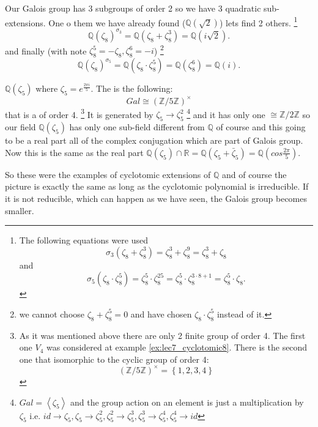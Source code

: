 \begin{example}[$n=8$]
  Our Galois group has 3 subgroups of order 2 so we have 3 quadratic
  sub-extensions. One o them we have already found
  ($\mathbb{Q}\left(\sqrt{2}\right)$) lets find 2 others.
  \footnote{
    The following equations were used
    \[
    \sigma_3\left(\zeta_8 + \zeta_8^3\right) =
    \zeta_8^3 + \zeta_8^9 = \zeta_8^3 + \zeta_8
    \]
    and
    \[
    \sigma_5\left(\zeta_8 \cdot \zeta_8^5\right) =
    \zeta_8^5 \cdot \zeta_8^{25} =
    \zeta_8^5 \cdot \zeta_8^{3 \cdot 8 + 1} =
    \zeta_8^5 \cdot \zeta_8.  
    \]
  }
  \[
  \mathbb{Q}\left(\zeta_8\right)^{\sigma_3} =
  \mathbb{Q}\left(\zeta_8 + \zeta_8^3\right) =
  \mathbb{Q}\left(i \sqrt{2}\right).
  \]
  and finally (with note $\zeta_8^5 = - \zeta_8, \zeta_8^6 = -i$)
  \footnote{
    we cannot choose $\zeta_8 + \zeta_8^5 = 0$ and have chosen
    $\zeta_8 \cdot \zeta_8^5$ instead of it.
  }
  \[
  \mathbb{Q}\left(\zeta_8\right)^{\sigma_5} =
  \mathbb{Q}\left(\zeta_8 \cdot \zeta_8^5\right) =
  \mathbb{Q}\left(\zeta_8^6\right) =
  \mathbb{Q}\left(i\right).
  \]
  \label{ex:lec7_cyclotomic8}
\end{example}

\begin{example}[$n=5$]
  $\mathbb{Q}\left(\zeta_5\right)$ where $\zeta_5 = e^{\frac{2 \pi
      i}{5}}$. The  is the following:
  \[
  Gal \cong \left(\mathbb{Z}/5\mathbb{Z}\right)^\times
  \]
  that is a  of order 4.
  \footnote{
    As it was mentioned above there are only 2 finite group of order
    4. The first one $V_4$ was considered at example
    \ref{ex:lec7_cyclotomic8}. There is the second one that isomorphic
    to the cyclic group of order 4:
    \[
    \left(\mathbb{Z}/5\mathbb{Z}\right)^\times =
    \left\{ 1,2,3,4
    \right\}
    \]
  }
  It is generated by
  $\zeta_5 \to \zeta_5^2$
  \footnote{
    $Gal = \left<\zeta_5\right>$ and the group action on an element is
    just a multiplication by $\zeta_5$ i.e.
    $id \to \zeta_5, \zeta_5 \to \zeta_5^2, \zeta_5^2 \to \zeta_5^3,
    \zeta_5^3 \to \zeta_5^4, \zeta_5^4 \to id$
  }
  and it has only one
   $\cong \mathbb{Z}/2\mathbb{Z}$ so our
  field $\mathbb{Q}\left(\zeta_5\right)$
  has only one sub-field different from $\mathbb{Q}$ of course and
  this going to be a real part all of the complex conjugation which
  are part of Galois group. Now this is the same as the real part
  \(\mathbb{Q}\left(\zeta_5\right) \cap \mathbb{R} =
  \mathbb{Q}\left(\zeta_5 + \bar{\zeta}_5\right) =
  \mathbb{Q}\left(cos \frac{2 \pi}{5}\right)\).
\end{example}
So these were the examples of cyclotomic extensions of $\mathbb{Q}$
and of course the picture is exactly the same as long as the
cyclotomic polynomial is irreducible. If it is not reducible, which
can happen as we have seen, the Galois group becomes smaller.

